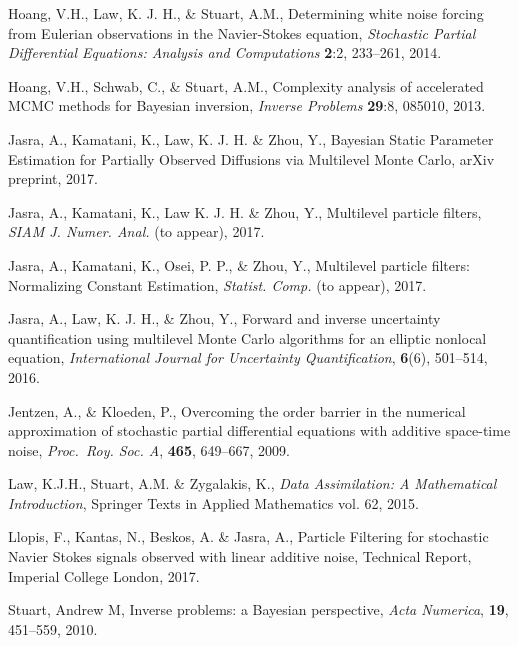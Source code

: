 \documentclass[english]{article}
\begin{document}
\begin{thebibliography}{9}
{ Hoang, V.H., Law, K. J. H., \& Stuart, A.M.}, 
{Determining white noise forcing from Eulerian observations in the Navier-Stokes equation, }
\emph{Stochastic Partial Differential Equations: Analysis and Computations}
{\bf 2}:{2}, {233--261}, 2014.


{ Hoang, V.H., Schwab, C., \& Stuart, A.M.}, 
{Complexity analysis of accelerated MCMC methods for Bayesian inversion, }
\emph{Inverse Problems} {\bf 29}:{8}, {085010}, 2013.




{ Jasra}, A., { Kamatani}, K., { Law}, K. J. H. \& { Zhou}, Y., 
Bayesian Static Parameter Estimation for Partially
Observed Diffusions via Multilevel Monte Carlo, arXiv preprint, 2017.


{ Jasra}, A., { Kamatani}, K., { Law} K. J. H. \& { Zhou}, Y., Multilevel particle filters,
\emph{SIAM J. Numer. Anal.} (to appear), 2017.

{ Jasra}, A., { Kamatani}, K., { Osei}, P. P., \& { Zhou}, Y., 
Multilevel particle filters: Normalizing Constant Estimation, \emph{Statist. Comp.} (to appear), 2017.

{ Jasra, A., Law, K. J. H., \& Zhou, Y.},  
Forward and inverse uncertainty quantification using multilevel 
Monte Carlo algorithms for an elliptic nonlocal equation, 
\emph{International Journal for Uncertainty Quantification}, 
{\bf 6}(6), 501--514, 2016.


{ Jentzen}, A., \& { Kloeden}, P., Overcoming the order barrier in the numerical
approximation of stochastic partial differential equations with additive 
space-time noise, \emph{Proc.~Roy. Soc. A},
{\bf 465}, 649--667, 2009.

{ Law, K.J.H., Stuart, A.M. \& Zygalakis, K.}, 
\emph{Data Assimilation: A Mathematical Introduction},
{Springer Texts in Applied Mathematics vol. 62}, 2015.


{ Llopis}, F., { Kantas}, N., { Beskos}, A. \& { Jasra}, A.,
Particle Filtering for stochastic Navier Stokes signals observed with linear additive noise, Technical Report,
Imperial College London, 2017.

 { Stuart, Andrew M}, 
 {Inverse problems: a Bayesian perspective, }
 \emph{Acta Numerica}, {\bf 19}, {451--559}, 2010.


\end{thebibliography}
\end{document}
